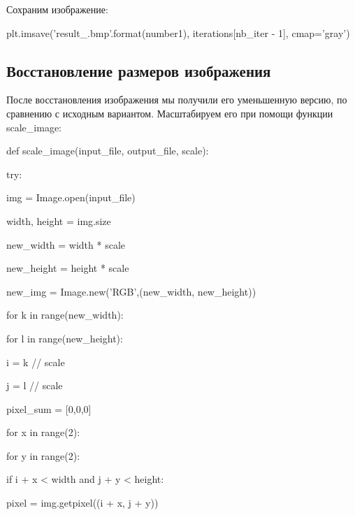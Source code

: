 \documentclass{article}
\begin{document}
Сохраним изображение:
\vspace{1em}

{
	
	plt.imsave('result\_{}.bmp'.format(number1), iterations[nb\_iter - 1], cmap='gray')
}
\vspace{1em}
\subsection{Восстановление размеров изображения}

После восстановления изображения мы получили его уменьшенную версию, по сравнению с исходным вариантом. Масштабируем его при помощи функции scale\_image:

{
def scale\_image(input\_file, output\_file, scale):

\hspace{1cm}	try:

\hspace{2cm}		img = Image.open(input\_file)

\hspace{2cm}		width, height = img.size

\hspace{2cm}		new\_width = width * scale

\hspace{2cm}		new\_height = height * scale

\hspace{2cm}		new\_img = Image.new('RGB',(new\_width, new\_height))


\hspace{2cm}		for k in range(new\_width):

\hspace{3cm}			for l in range(new\_height):

\hspace{4cm}				i = k // scale

\hspace{4cm}				j = l // scale

\hspace{4cm}				pixel\_sum = [0,0,0]

\hspace{4cm}				for x in range(2):

\hspace{5cm}					for y in range(2):

\hspace{6cm}						if i + x < width and j + y < height:

\hspace{7cm}							pixel = img.getpixel((i + x, j + y))

}
\end{document}
